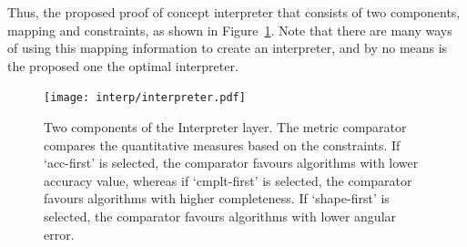 Thus, the proposed proof of concept interpreter that consists of two components, mapping and constraints, as shown in Figure~\ref{fig:interpreter}. Note that there are many ways of using this mapping information to create an interpreter, and by no means is the proposed one the optimal interpreter. 
\begin{figure}[!htbp]
\centering
\texttt{[image: interp/interpreter.pdf]}
\caption{Two components of the Interpreter layer. The metric comparator compares the quantitative measures based on the constraints. If `acc-first' is selected, the comparator favours algorithms with lower accuracy value, whereas if `cmplt-first' is selected, the comparator favours algorithms with higher completeness. If `shape-first' is selected, the comparator favours algorithms with lower angular error.}
\label{fig:interpreter}
\end{figure}




